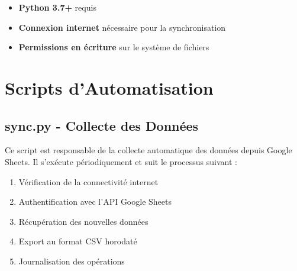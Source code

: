 \documentclass[11pt,a4paper]{article}
\begin{document}
\begin{itemize}
    \item \textbf{Python 3.7+} requis
    \item \textbf{Connexion internet} nécessaire pour la synchronisation
    \item \textbf{Permissions en écriture} sur le système de fichiers
\end{itemize}

\section{Scripts d'Automatisation}
\label{sec:automation-scripts}

\subsection{sync.py - Collecte des Données}
\label{subsec:sync-script}

Ce script est responsable de la collecte automatique des données depuis Google Sheets. Il s'exécute périodiquement et suit le processus suivant :

\begin{enumerate}
    \item Vérification de la connectivité internet
    \item Authentification avec l'API Google Sheets
    \item Récupération des nouvelles données
    \item Export au format CSV horodaté
    \item Journalisation des opérations
\end{enumerate}
\end{document}
